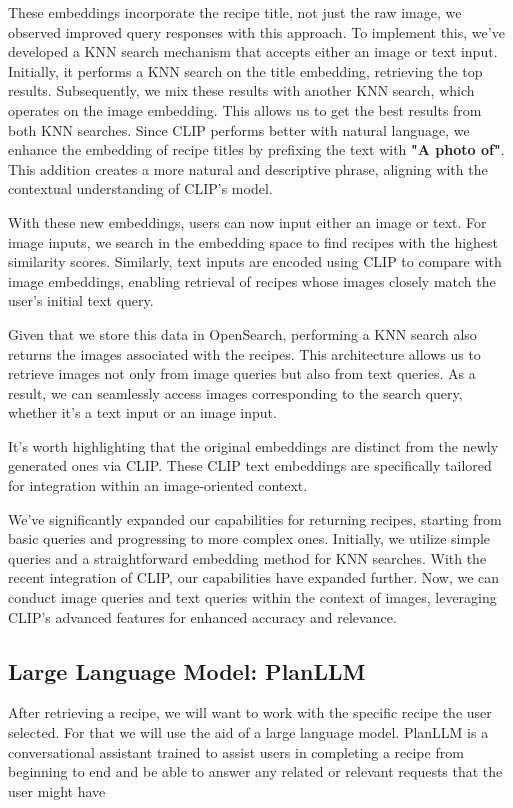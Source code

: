 \documentclass[runningheads]{llncs}
\begin{document}
These embeddings incorporate the recipe title, not just the raw image, we observed improved query responses with this approach. To implement this, we've developed a KNN search mechanism that accepts either an image or text input. Initially, it performs a KNN search on the title embedding, retrieving the top results. Subsequently, we mix these results with another KNN search, which operates on the image embedding. This allows us to get the best results from both KNN searches. Since CLIP performs better with natural language, we enhance the embedding of recipe titles by prefixing the text with \textbf{"A photo of"}. This addition creates a more natural and descriptive phrase, aligning with the contextual understanding of CLIP's model.

With these new embeddings, users can now input either an image or text. For image inputs, we search in the embedding space to find recipes with the highest similarity scores. Similarly, text inputs are encoded using CLIP to compare with image embeddings, enabling retrieval of recipes whose images closely match the user's initial text query. 


Given that we store this data in OpenSearch, performing a KNN search also returns the images associated with the recipes. This architecture allows us to retrieve images not only from image queries but also from text queries. As a result, we can seamlessly access images corresponding to the search query, whether it's a text input or an image input.

It's worth highlighting that the original embeddings are distinct from the newly generated ones via CLIP. These CLIP text embeddings are specifically tailored for integration within an image-oriented context. 

We've significantly expanded our capabilities for returning recipes, starting from basic queries and progressing to more complex ones. Initially, we utilize simple queries and a straightforward embedding method for KNN searches. With the recent integration of CLIP, our capabilities have expanded further. Now, we can conduct image queries and text queries within the context of images, leveraging CLIP's advanced features for enhanced accuracy and relevance.

\subsection{Large Language Model: PlanLLM}
After retrieving a recipe, we will want to work with the specific recipe the user selected. For that we will use the aid of a large language model. PlanLLM is a conversational assistant trained to assist users in completing a recipe from beginning to end and be able to answer any related or relevant requests that the user might have ~\cite{planllmeacl24}
\end{document}
